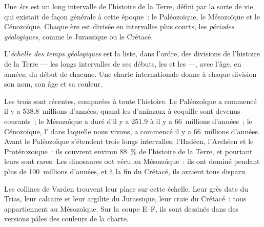 \begin{definition}\label{def:g7:geological-time:era-period}
Une \emph{ère} est un long intervalle de l'histoire de la
Terre, défini par la sorte de vie qui existait de façon générale à cette
époque~: le Paléozoïque, le Mésozoïque et le Cénozoïque. Chaque ère est
divisée en intervalles plus courts, les
\emph{périodes géologiques},
comme le Jurassique ou le Crétacé.
\end{definition}

\begin{definition}\label{def:g7:geological-time:time-scale}
L'\emph{échelle des temps géologiques}
est la liste, dans l'ordre, des divisions de l'histoire de la Terre --- les
longs intervalles de ses débuts, les  et les  ---,
avec l'âge, en années, du début de chacune. Une charte internationale
donne à chaque division son nom, son âge et sa couleur.
\end{definition}


Les trois  sont récentes, comparées à toute l'histoire. Le Paléozoïque
a commencé il y a \num{538.8}~millions d'années, quand les 
d'animaux à coquille sont devenus courants~; le Mésozoïque a duré d'il y a
\num{251.9} à il y a \num{66}~millions d'années~; le Cénozoïque, l' dans
laquelle nous vivons, a commencé il y a \num{66}~millions d'années. Avant
le Paléozoïque s'étendent trois longs intervalles, l'Hadéen, l'Archéen et
le Protérozoïque~: ils couvrent environ 88~\% de l'histoire de la Terre,
et pourtant leurs  sont rares. Les dinosaures ont vécu au
Mésozoïque~: ils ont dominé pendant plus de \num{100}~millions d'années,
et à la fin du Crétacé, ils avaient tous disparu.

Les collines de Varden trouvent leur place sur cette échelle. Leur grès
date du Trias, leur calcaire et leur argilite du Jurassique, leur craie du
Crétacé~: tous appartiennent au Mésozoïque. Sur la coupe E--F, ils sont
dessinés dans des versions pâles des couleurs de la charte.

